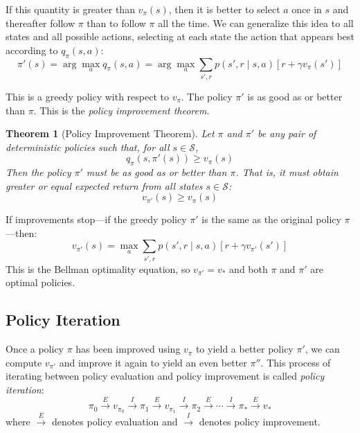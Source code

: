 \documentclass[12pt]{article}
\newtheorem{theorem}{Theorem}
\begin{document}
If this quantity is greater than $v_\pi(s)$, then it is better to select $a$ once in $s$ and thereafter follow $\pi$ than to follow $\pi$ all the time. We can generalize this idea to all states and all possible actions, selecting at each state the action that appears best according to $q_\pi(s, a)$:
\begin{equation}
\pi'(s) = \arg\max_a q_\pi(s, a) = \arg\max_a \sum_{s', r} p(s', r \mid s, a)[r + \gamma v_\pi(s')]
\end{equation}

This is a greedy policy with respect to $v_\pi$. The policy $\pi'$ is as good as or better than $\pi$. This is the \textit{policy improvement theorem}.

\begin{theorem}[Policy Improvement Theorem]
Let $\pi$ and $\pi'$ be any pair of deterministic policies such that, for all $s \in \mathcal{S}$,
\begin{equation}
q_\pi(s, \pi'(s)) \ge v_\pi(s)
\end{equation}
Then the policy $\pi'$ must be as good as or better than $\pi$. That is, it must obtain greater or equal expected return from all states $s \in \mathcal{S}$:
\begin{equation}
v_{\pi'}(s) \ge v_\pi(s)
\end{equation}
\end{theorem}

If improvements stop—if the greedy policy $\pi'$ is the same as the original policy $\pi$—then:
\begin{equation}
v_{\pi'}(s) = \max_a \sum_{s', r} p(s', r \mid s, a)[r + \gamma v_{\pi'}(s')]
\end{equation}
This is the Bellman optimality equation, so $v_{\pi'} = v_*$ and both $\pi$ and $\pi'$ are optimal policies.

\subsection{Policy Iteration}

Once a policy $\pi$ has been improved using $v_\pi$ to yield a better policy $\pi'$, we can compute $v_{\pi'}$ and improve it again to yield an even better $\pi''$. This process of iterating between policy evaluation and policy improvement is called \textit{policy iteration}:
\begin{equation}
\pi_0 \xrightarrow{E} v_{\pi_0} \xrightarrow{I} \pi_1 \xrightarrow{E} v_{\pi_1} \xrightarrow{I} \pi_2 \xrightarrow{E} \cdots \xrightarrow{I} \pi_* \xrightarrow{E} v_*
\end{equation}
where $\xrightarrow{E}$ denotes policy evaluation and $\xrightarrow{I}$ denotes policy improvement.
\end{document}
